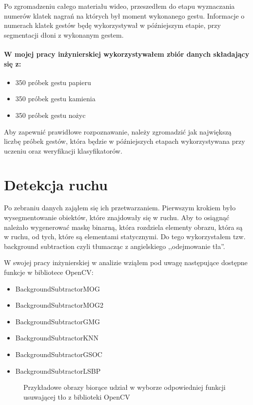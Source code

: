 \documentclass[a4paper,12pt,twoside,openany]{report}
\newcommand{\ImgPath}{.}
\begin{document}
Po zgromadzeniu całego materiału wideo, przeszedłem do etapu wyznaczania numerów klatek nagrań na których był moment wykonanego gestu. Informacje o numerach klatek gestów będę wykorzystywał w późniejszym etapie, przy segmentacji dłoni z wykonanym gestem.

\paragraph{W mojej pracy inżynierskiej wykorzystywałem zbiór danych składający się z:}
\begin{itemize}
	\item 350 próbek gestu papieru
	\item 350 próbek gestu kamienia
	\item 350 próbek gestu nożyc
\end{itemize}

Aby zapewnić prawidłowe rozpoznawanie, należy zgromadzić jak największą liczbę próbek gestów, która będzie w późniejszych etapach wykorzystywana przy uczeniu oraz weryfikacji klasyfikatorów.

\section{Detekcja ruchu}
Po zebraniu danych zająłem się ich przetwarzaniem. Pierwszym krokiem było wysegmentowanie obiektów, które znajdowały się w ruchu. Aby to osiągnąć należało wygenerować maskę binarną, która rozdziela elementy obrazu, która są w ruchu, od tych, które są elementami statycznymi. Do tego wykorzystałem tzw. background subtraction czyli tłumacząc z angielskiego ,,odejmowanie tła''.

W swojej pracy inżynierskiej w analizie wziąłem pod uwagę następujące dostępne funkcje w bibliotece OpenCV:

\begin{itemize} 
	\item BackgroundSubtractorMOG
	\item BackgroundSubtractorMOG2
	\item BackgroundSubtractorGMG
	\item BackgroundSubtractorKNN
	\item BackgroundSubtractorGSOC
	\item BackgroundSubtractorLSBP
\end{itemize} 

\begin{figure}[H]
	\centering
	\caption{Przykładowe obrazy biorące udział w wyborze odpowiedniej funkcji usuwającej tło z biblioteki OpenCV}
\end{figure}
\end{document}

